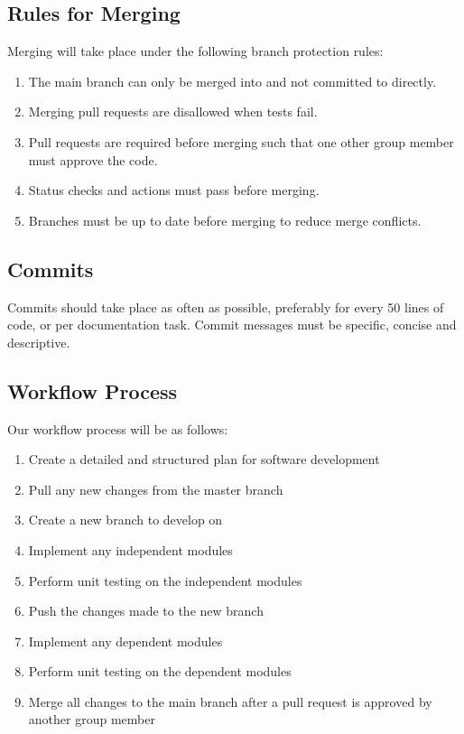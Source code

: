 \documentclass{article}
\begin{document}
\subsection{Rules for Merging}

Merging will take place under the following branch protection rules: 

\begin{enumerate}

\item The main branch can only be merged into and not committed to directly. 
\item Merging pull requests are disallowed when tests fail. 
\item Pull requests are required before merging such that one other group member must approve the code. 
\item Status checks and actions must pass before merging. 
\item Branches must be up to date before merging to reduce merge conflicts. 

\end{enumerate} 

\subsection{Commits}

Commits should take place as often as possible, preferably for every 50 lines of code, or per documentation task. Commit messages must be specific, concise and descriptive. 

\subsection{Workflow Process}

Our workflow process will be as follows:

\begin{enumerate}
\item Create a detailed and structured plan for software development
\item Pull any new changes from the master branch
\item Create a new branch to develop on
\item Implement any independent modules
\item Perform unit testing on the independent modules
\item Push the changes made to the new branch
\item Implement any dependent modules
\item Perform unit testing on the dependent modules
\item Merge all changes to the main branch after a pull request is approved by another group member
\end{enumerate}
\end{document}
